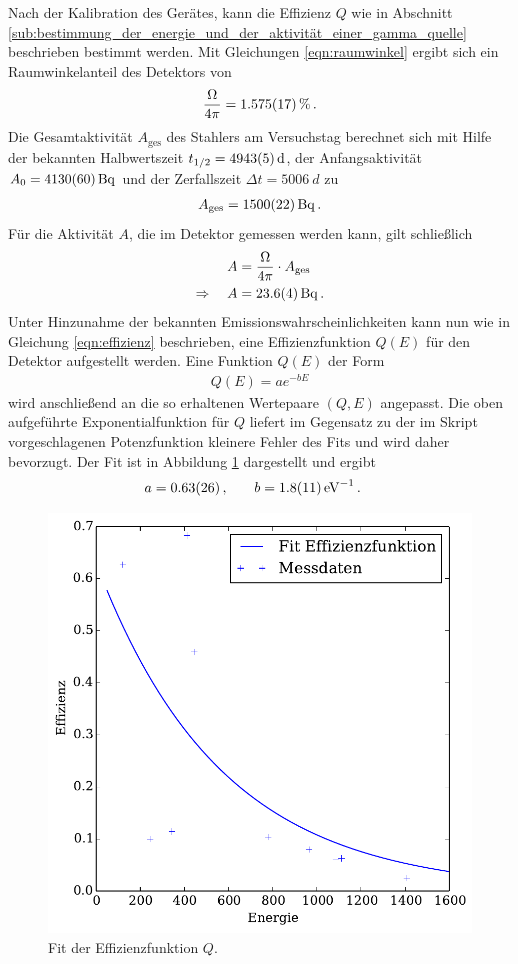 Nach der Kalibration des Gerätes, kann die Effizienz $Q$ wie in Abschnitt
\ref{sub:bestimmung_der_energie_und_der_aktivität_einer_gamma_quelle}
beschrieben bestimmt werden. Mit Gleichungen \eqref{eqn:raumwinkel} ergibt
sich ein Raumwinkelanteil des Detektors von
\begin{align*}
    \frac{\Omega}{4\pi} = \SI{1.575+-0.017}{\percent}\,.
\end{align*}
Die Gesamtaktivität $A_\text{ges}$ des Stahlers am Versuchstag berechnet
sich mit Hilfe der bekannten Halbwertszeit $t_{1/2} = \SI{4943+-5}{d}$, der
Anfangsaktivität $A_0 = \SI{4130+-60}{\becquerel}$ und der Zerfallszeit $\Delta
t = \SI{5006}{d}$ zu
\begin{align*}
    A_\text{ges} = \SI{1500+-22}{\becquerel}\,.
\end{align*}
Für die Aktivität $A$, die im Detektor gemessen werden kann, gilt schließlich
\begin{align*}
    A &= \frac{\Omega}{4\pi}\cdot A_\text{ges}\,\\
    \Rightarrow \quad A &= \SI{23.6+-0.4}{\becquerel}\,.
\end{align*}
Unter Hinzunahme der bekannten Emissionswahrscheinlichkeiten kann nun wie
in Gleichung \eqref{eqn:effizienz} beschrieben, eine Effizienzfunktion $Q(E)$
für den Detektor aufgestellt werden.
Eine Funktion $Q(E)$ der Form
\begin{align*}
    Q(E) = ae^{-bE}
\end{align*}
wird anschließend an die so erhaltenen Wertepaare $(Q,E)$ angepasst. Die oben
aufgeführte Exponentialfunktion für $Q$ liefert im Gegensatz zu der im Skript
vorgeschlagenen Potenzfunktion kleinere Fehler des Fits und wird daher bevorzugt.
Der Fit ist in Abbildung \ref{fig:efficiency_fit} dargestellt und ergibt
\begin{align*}
    a &= \num{0.63+-0.26}\,, &\quad b &= \SI{1.8+-1.1}{eV^{-1}}\,.
\end{align*}

\begin{figure}[htb]
    \centering
    \includegraphics[width=0.7\linewidth]{img/05_efficiencies.pdf}
    \caption{
        Fit der Effizienzfunktion $Q$.
    }
    \label{fig:efficiency_fit}
\end{figure}

